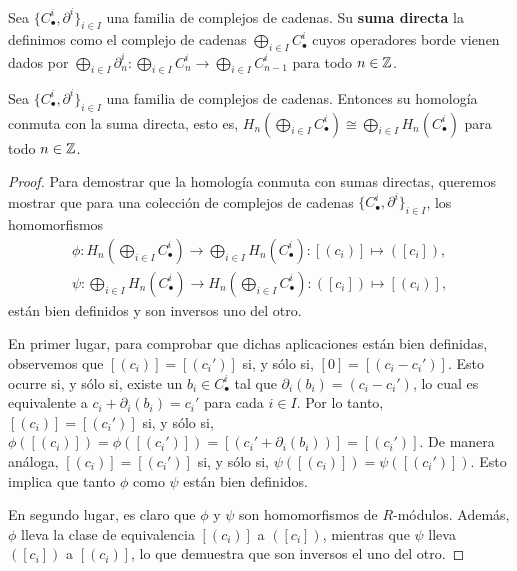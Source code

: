 \begin{definicion}
	Sea \(\{C_{\bullet}^{i}, \partial^{i}\}_{i \in I}\) una familia de complejos de cadenas.
	Su \textbf{suma directa} la definimos como el complejo de cadenas \(\bigoplus_{i
		\in I}C^{i}_{\bullet}\) cuyos operadores borde vienen dados por \(\bigoplus_{i
		\in I}{\partial}^{i}_{n}: \bigoplus_{i \in I}C^{i}_{n}\to \bigoplus_{i \in I}C^{i}
	_{n-1}\) para todo \(n \in \mathbb{Z}\).
\end{definicion}
\begin{proposicion}
	\label{prop:hom-free-commute} Sea \(\{C_{\bullet}^{i}, \partial^{i}\}_{i \in I}\)
	una familia de complejos de cadenas. Entonces su homología conmuta con la suma
	directa, esto es,
	\(H_{n}(\bigoplus_{i \in I}C_{\bullet}^{i}) \cong \bigoplus_{i \in I}H_{n}(C_{\bullet}
	^{i})\)
	para todo \(n \in \mathbb{Z}\).
\end{proposicion}
\begin{proof}
	Para demostrar que la homología conmuta con sumas directas, queremos mostrar
	que para una colección de complejos de cadenas
	\(\{C_{\bullet}^{i}, \partial^{i}\}_{i \in I}\), los homomorfismos
	\begin{align*}
		\phi: H_{n}\left( \bigoplus_{i \in I}C_{\bullet}^{i}\right) \rightarrow \bigoplus_{i \in I}H_{n}(C_{\bullet}^{i}) : [(c_{i})] \mapsto ([c_{i}]), \\
		\psi: \bigoplus_{i \in I}H_{n}(C_{\bullet}^{i}) \rightarrow H_{n}\left( \bigoplus_{i \in I}C_{\bullet}^{i}\right) : ([c_{i}]) \mapsto [(c_{i})],
	\end{align*}
	están bien definidos y son inversos uno del otro.
	
	En primer lugar, para comprobar que dichas aplicaciones están bien definidas, observemos
	que \([(c_{i})] = [(c_{i}')]\) si, y sólo si, \([0] = [(c_{i}- c_{i}')]\). Esto
	ocurre si, y sólo si, existe un \(b_{i}\in C_{\bullet}^{i}\) tal que
	\(\partial_{i}(b_{i}) = (c_{i}- c_{i}')\), lo cual es equivalente a \(c_{i}+ \partial
	_{i}(b_{i}) = c_{i}'\) para cada \(i \in I\). Por lo tanto, \([(c_{i})] = [(c_{i}')
	]\) si, y sólo si, \(\phi([(c_{i})]) = \phi([(c_{i}')]) = [(c_{i}' + \partial_{i}
	(b_{i}))] = [(c_{i}')]\). De manera análoga, \([(c_{i})] = [(c_{i}')]\) si, y
	sólo si, \(\psi([(c_{i})]) = \psi([(c_{i}')])\). Esto implica que tanto \(\phi\)
	como \(\psi\) están bien definidos.
	
	En segundo lugar, es claro que \(\phi\) y \(\psi\) son homomorfismos de \(R\)-módulos.
	Además, \(\phi\) lleva la clase de equivalencia \([(c_{i})]\) a \(([c_{i}])\),
	mientras que \(\psi\) lleva \(([c_{i}])\) a \([(c_{i})]\), lo que demuestra que son inversos
	el uno del otro.
\end{proof}

